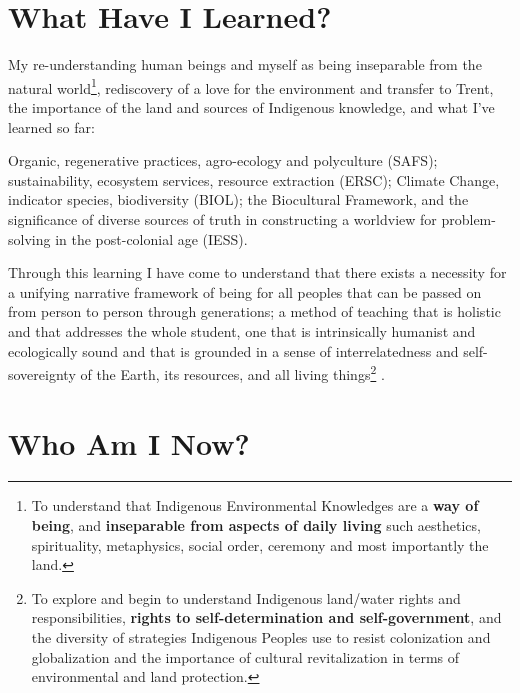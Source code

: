 \documentclass{report}
\begin{document}
\section{What Have I Learned?}

My re-understanding human beings and myself as being inseparable from the natural world\footnote{To understand that Indigenous Environmental Knowledges are a \textbf{way of being}, and \textbf{inseparable from aspects of daily living} such aesthetics, spirituality, metaphysics, social order, ceremony and most importantly the land.}, rediscovery of a love for the environment and transfer to Trent, the importance of the land and sources of Indigenous knowledge, and what I've learned so far:

\hspace{24pt}Organic, regenerative practices, agro-ecology and polyculture (SAFS); sustainability, ecosystem services, resource extraction (ERSC); Climate Change, indicator species, biodiversity (BIOL); the Biocultural Framework, and the significance of diverse sources of truth in constructing a worldview for problem-solving in the post-colonial age (IESS).

\hspace{24pt}Through this learning I have come to understand that there exists a necessity for a unifying narrative framework of being for all peoples that can be passed on from person to person through generations; a method of teaching that is holistic and that addresses the whole student, one that is intrinsically humanist and ecologically sound and that is grounded in a sense of interrelatedness and self-sovereignty of the Earth, its resources, and all living things\footnote{To explore and begin to understand Indigenous land/water rights and responsibilities, \textbf{rights to self-determination and self-government}, and the diversity of strategies Indigenous Peoples use to resist colonization and globalization and the importance of cultural revitalization in terms of environmental and land protection.} \parencite{holistic}.

\section{Who Am I Now?}
\end{document}
